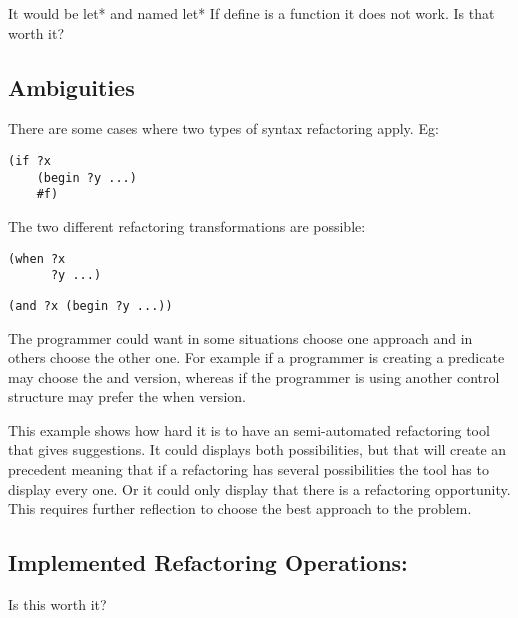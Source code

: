 It would be let* and named let* If define is a function it does not work.
Is that worth it?

\subsection{Ambiguities}
There are some cases where two types of syntax refactoring apply.
Eg:
\begin{lstlisting}[basicstyle=\ttfamily, caption="Example"]
(if ?x
    (begin ?y ...)
    #f)
\end{lstlisting}
The two different refactoring transformations are possible:
\begin{lstlisting}[basicstyle=\ttfamily, caption="Example"]
(when ?x
      ?y ...)
\end{lstlisting}

\begin{lstlisting}[basicstyle=\ttfamily, caption="Example"]
(and ?x (begin ?y ...))
\end{lstlisting}

The programmer could want in some situations choose one approach and in others
choose the other one. For example if a programmer is creating a predicate may
choose the and version, whereas if the programmer is using another control structure
may prefer the when version.

This example shows how hard it is to have an semi-automated refactoring tool
that gives suggestions.
It could displays both possibilities, but that will create an precedent meaning
that if a refactoring has several possibilities the tool has to display every one.
Or it could only display that there is a refactoring opportunity.
This requires further reflection to choose the best approach to the problem.


\subsection{Implemented Refactoring Operations:}
Is this worth it?

